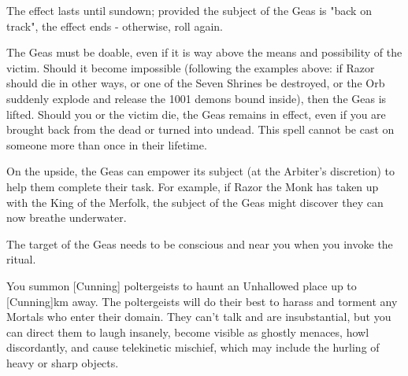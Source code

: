 
The effect lasts until sundown; provided the subject of the Geas is "back on track", the effect ends - otherwise, roll again.

The Geas must be doable, even if it is way above the means and possibility of the victim.  Should it become impossible (following the examples above: if Razor should die in other ways, or one of the Seven Shrines be destroyed, or the Orb suddenly explode and release the 1001 demons bound inside), then the Geas is lifted.  Should you or the victim die, the Geas remains in effect, even if you are brought back from the dead or turned into undead. This spell cannot be cast on someone more than once in their lifetime.

On the upside, the Geas can empower its subject (at the Arbiter's discretion) to help them complete their task.  For example, if Razor the Monk has taken up with the King of the Merfolk, the subject of the Geas might discover they can now breathe underwater.

The target of the Geas needs to be conscious and near you when you invoke the ritual.

\OCCULT[
  Name=Haunt,
  Link=occultism-haunt,
  Success=3+,
  Cost=666\FE
]


You summon [Cunning] poltergeists to haunt an Unhallowed place up to [Cunning]km away.  The poltergeists will do their best to harass and torment any Mortals who enter their domain. They can't talk and are insubstantial, but you can direct them to laugh insanely, become visible as ghostly menaces, howl discordantly, and cause telekinetic mischief, which may include the hurling of heavy or sharp objects.

